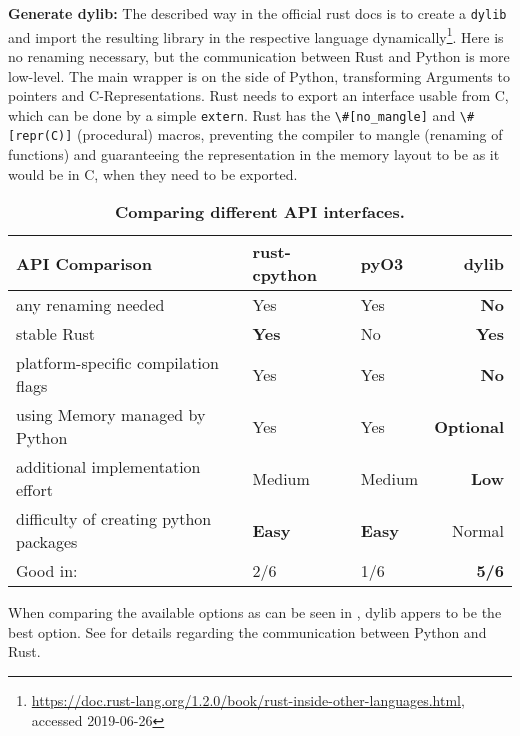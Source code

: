 \textbf{Generate dylib:} The described way in the official rust docs is to
create a \verb|dylib| and import the resulting library in the respective
language
dynamically\footnote{\url{https://doc.rust-lang.org/1.2.0/book/rust-inside-other-languages.html}, \\
accessed 2019-06-26}.  Here is no renaming necessary, but the
communication between Rust and Python is more low-level. The main wrapper
is on the side of Python, transforming Arguments to pointers and
C-Representations. Rust needs to export an interface usable from C, which can
be done by a simple \verb|extern|. Rust has the \verb!\#[no_mangle]! and
\verb!\#[repr(C)]! (procedural) macros, preventing the compiler to mangle
(renaming of functions) and guaranteeing the representation in the memory
layout to be as it would be in C, when they need to be exported.


\begin{table}[ht]
\begin{tabular}{@{}lllr@{}}
    \textbf{API Comparison} & rust-cpython & pyO3 & dylib \\
    \midrule
    any renaming needed             & Yes    & Yes & \textbf{No} \\
    stable Rust                     & \textbf{Yes}    & No  & \textbf{Yes} \\
    platform-specific compilation flags & Yes & Yes & \textbf{No} \\
    using Memory managed by Python  & Yes    & Yes & \textbf{Optional} \\
    additional implementation effort                 & Medium & Medium & \textbf{Low} \\
    difficulty of creating python packages        & \textbf{Easy}\footnotemark  & \textbf{Easy}\footnotemark[\value{footnote}] & Normal \\
    \midrule
    Good in: & 2/6 & 1/6 & \textbf{5/6} \\
\end{tabular}
    \caption[Comparison of different Interfaces between Rust and Python]{\textbf{Comparing different API interfaces.}}
    \label{tab:interfaces}
\end{table}


When comparing the available options as can be seen in ,
dylib appers to be the best option. See  for details
regarding the communication between Python and Rust. 


